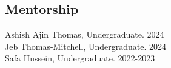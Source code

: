 \subsection{Mentorship}

Ashish Ajin Thomas, Undergraduate. \hfill 2024 \\
Jeb Thomas-Mitchell, Undergraduate. \hfill 2024 \\
Safa Hussein, Undergraduate. \hfill 2022-2023